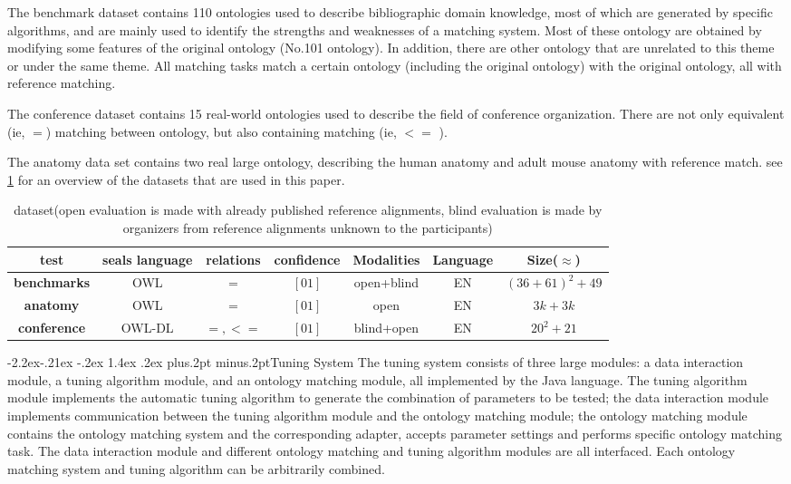 \documentclass[twoside]{article}
\makeatletter
\def\subsubsection{\@startsection{subsubsection}{3}{\z@}%
 {-2.2ex\@plus -.21ex \@minus -.2ex}%
 {1.4ex \@plus.2ex}
{\normalfont\normalsize\protect\baselineskip=12pt plus.2pt minus.2pt\sl}}
\makeatother
\begin{document}
The benchmark dataset contains 110 ontologies used to describe bibliographic domain knowledge, most of which are generated by specific algorithms, and are mainly used to identify the strengths and weaknesses of a matching system. Most of these ontology are obtained by modifying some features of the original ontology (No.101 ontology). In addition, there are other ontology that are unrelated to this theme or under the same theme.
All matching tasks match a certain ontology (including the original ontology) with the original ontology, all with reference matching.

The conference dataset contains 15 real-world ontologies used to describe the field of conference organization. There are not only equivalent (ie, $=$) matching between ontology, but also containing matching (ie, $<=$ ).

The anatomy data set contains two real large ontology, describing the human anatomy and adult mouse anatomy with reference match.
see \ref{table:dataset} for an overview of the datasets that are used in this paper.

\begin{table}[ht]
\centering
\caption{dataset(open evaluation is made with already published reference alignments, blind evaluation is made by organizers from reference alignments unknown to the
participants)}
\label{table:dataset}
\begin{tabular}{@{}ccccccc@{}}
\toprule
test				& seals language	& relations	 	& confidence	& Modalities	& Language	& Size($\approx$)		\\ \midrule
{\bf benchmarks}	& OWL				& $=$		 	& $[0 1]$		& open+blind	& EN		& $(36+61)^2+49$	\\
{\bf anatomy}		& OWL				& $=$		 	& $[0 1]$		& open			& EN		& $3k+3k$			\\
{\bf conference}	& OWL-DL			& $=,<=$	 	& $[0 1]$		& blind+open	& EN		& $20^2+21$		\\ \bottomrule
\end{tabular}
\end{table}


\subsubsection{Tuning System}
The tuning system consists of three large modules: a data interaction module, a tuning algorithm module, and an ontology matching module, all implemented by the Java language.
The tuning algorithm module implements the automatic tuning algorithm to generate the combination of parameters to be tested; the data interaction module implements communication between the tuning algorithm module and the ontology matching module; the ontology matching module contains the ontology matching system and the corresponding adapter, accepts parameter settings and performs specific ontology matching task.
The data interaction module and different ontology matching and tuning algorithm modules are all interfaced. Each ontology matching system and tuning algorithm can be arbitrarily combined.
\end{document}
